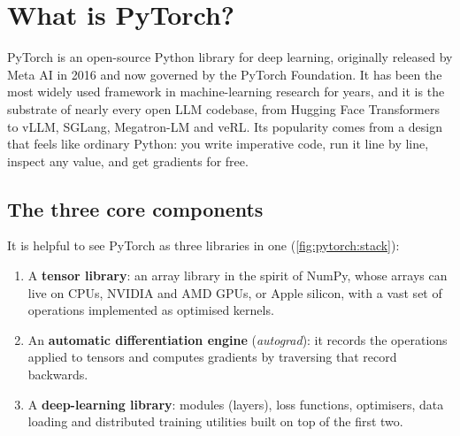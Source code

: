 \section{What is PyTorch?}\label{sec:pytorch:what}

PyTorch is an open-source Python library for deep learning, originally released by Meta AI in 2016 and now
governed by the PyTorch Foundation. It has been the most widely used framework in machine-learning research
for years, and it is the substrate of nearly every open LLM codebase, from Hugging Face Transformers to
vLLM, SGLang, Megatron-LM and veRL. Its popularity comes from a design that feels like ordinary Python: you
write imperative code, run it line by line, inspect any value, and get gradients for free.

\subsection{The three core components}
It is helpful to see PyTorch as three libraries in one (\cref{fig:pytorch:stack}):
\begin{enumerate}
\item A \textbf{tensor library}: an array library in the spirit of NumPy, whose arrays can live on CPUs,
  NVIDIA and AMD GPUs, or Apple silicon, with a vast set of operations implemented as optimised kernels.
\item An \textbf{automatic differentiation engine} (\emph{autograd}): it records the operations applied to
  tensors and computes gradients by traversing that record backwards.
\item A \textbf{deep-learning library}: modules (layers), loss functions, optimisers, data loading and
  distributed training utilities built on top of the first two.
\end{enumerate}

